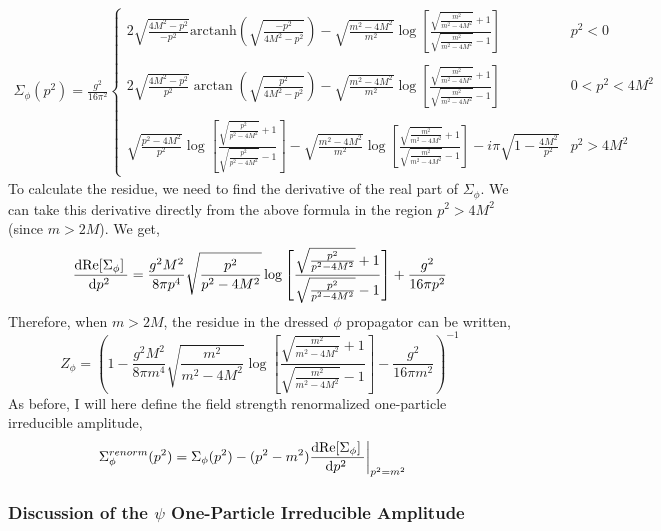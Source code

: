 \documentclass[12pt]{extarticle}
\begin{document}
\begin{align*}
\Sigma_\phi(p^2) =
\frac{g^2}{16 \pi^2}
\begin{cases}
2 \sqrt{\frac{4 M^2 - p^2}{-p^2}} \mathrm{arctanh}{\left(\sqrt{\frac{-p^2}{4 M^2 - p^2}}\right)} - \sqrt{\frac{m^2 - 4 M^2}{m^2}} \log{\left[ \frac{\sqrt{\frac{m^2}{m^2 - 4 M^2}} + 1}{\sqrt{\frac{m^2}{m^2 - 4 M^2}} - 1} \right]} 
& p^2 < 0
\\
&
\\
2 \sqrt{\frac{4 M^2 - p^2}{p^2}} \arctan{\left( \sqrt{\frac{p^2}{4 M^2 - p^2}} \right)} - \sqrt{\frac{m^2 - 4 M^2}{m^2}} \log{\left[ \frac{\sqrt{\frac{m^2}{m^2 - 4 M^2}} + 1}{\sqrt{\frac{m^2}{m^2 - 4 M^2}} - 1} \right]}
& 0 < p^2 < 4 M^2 
\\
&
\\
\sqrt{\frac{p^2 - 4 M^2}{p^2}} \log{\left[ \frac{\sqrt{\frac{p^2}{p^2 - 4 M^2}} + 1}{\sqrt{\frac{p^2}{p^2 - 4 M^2}} - 1} \right]} 
- \sqrt{\frac{m^2 - 4 M^2}{m^2}} \log{\left[ \frac{\sqrt{\frac{m^2}{m^2 - 4 M^2}} + 1}{\sqrt{\frac{m^2}{m^2 - 4 M^2}} - 1} \right]} - i\pi \sqrt{1 - \frac{4 M^2}{p^2}}
& p^2 > 4 M^2
\end{cases}
\end{align*}
To calculate the residue, we need to find the derivative of the real part of $\Sigma_\phi$. We can take this derivative directly from the above formula in the region $p^2 > 4 M^2$ (since $m > 2 M$). We get,
\[ \frac{\mathrm{d}\mathrm{Re}[\Sigma_\phi] \:}{\mathrm{d}p^2 \:} = \frac{g^2 M^2}{8 \pi p^4} \sqrt{\frac{p^2}{p^2-4 M^2}} \log{\left[\frac{\sqrt{\frac{p^2}{p^2-4
   M^2}}+1}{\sqrt{\frac{p^2}{p^2-4 M^2}}-1}\right]} + \frac{g^2}{16 \pi p^2}  \]
Therefore, when $m > 2 M$, the residue in the dressed $\phi$ propagator can be written,
\[ Z_\phi = \left( 1 - \frac{g^2 M^2}{8 \pi m^4} \sqrt{\frac{m^2}{m^2-4 M^2}} \log{ \left[\frac{\sqrt{\frac{m^2}{m^2-4
   M^2}}+1}{\sqrt{\frac{m^2}{m^2-4 M^2}}-1}\right]} - \frac{g^2}{16 \pi m^2}  \right)^{-1} \]
As before, I will here define the field strength renormalized one-particle irreducible amplitude,
\begin{align*}
\Sigma_\phi^{renorm}(p^2) & = \Sigma_\phi(p^2) - (p^2 - m^2) \frac{\mathrm{d}\mathrm{Re}[\Sigma_\phi] \:}{\mathrm{d}p^2 \:} \bigg|_{p^2 = m^2} 
\end{align*}

\subsubsection{Discussion of the $\psi$ One-Particle Irreducible Amplitude}
\end{document}
